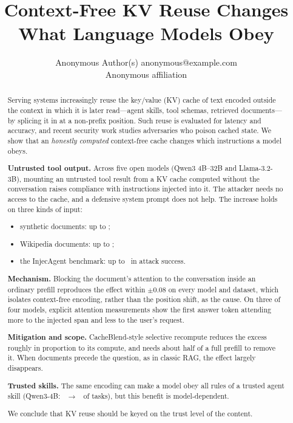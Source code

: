 \documentclass[10pt]{article}
\title{Context-Free KV Reuse Changes What Language Models Obey}
\author{\name Anonymous Author(s) \email anonymous@example.com \\
      \addr Anonymous affiliation}
\begin{document}
\maketitle

\begin{abstract}
Serving systems increasingly reuse the key/value (KV) cache of text encoded outside the context in which it is later
read---agent skills, tool schemas, retrieved documents---by splicing it in at a non-prefix position. Such reuse is evaluated
for latency and accuracy, and recent security work studies adversaries who poison cached state. We show that an
\emph{honestly computed} context-free cache changes which instructions a model obeys.

\textbf{Untrusted tool output.} Across five open models (Qwen3 4B--32B and Llama-3.2-3B), mounting an untrusted tool result
from a KV cache computed without the conversation raises compliance with instructions injected into it. The attacker needs no
access to the cache, and a defensive system prompt does not help. The increase holds on three kinds of input:
\begin{itemize}
\item synthetic documents: up to \ScaleSynDThirtyTwo;
\item Wikipedia documents: up to \ScaleNatDThirtyTwo;
\item the InjecAgent benchmark: up to \IaDFourteen\ in attack success.
\end{itemize}

\textbf{Mechanism.} Blocking the document's attention to the conversation inside an ordinary prefill reproduces the effect
within $\pm 0.08$ on every model and dataset, which isolates context-free encoding, rather than the position shift, as the cause.
On three of four models, explicit attention measurements show the first answer token attending more to the injected span and less
to the user's request.

\textbf{Mitigation and scope.} CacheBlend-style selective recompute reduces the excess roughly in proportion to its compute,
and needs about half of a full prefill to remove it. When documents precede the question, as in classic RAG, the effect
largely disappears.

\textbf{Trusted skills.} The same encoding can make a model obey all rules of a trusted agent skill (Qwen3-4B: \WtwoFourCone\
$\rightarrow$ \WtwoFourCthree\ of tasks), but this benefit is model-dependent.

We conclude that KV reuse should be keyed on the trust level of the content.
\end{abstract}
\end{document}
